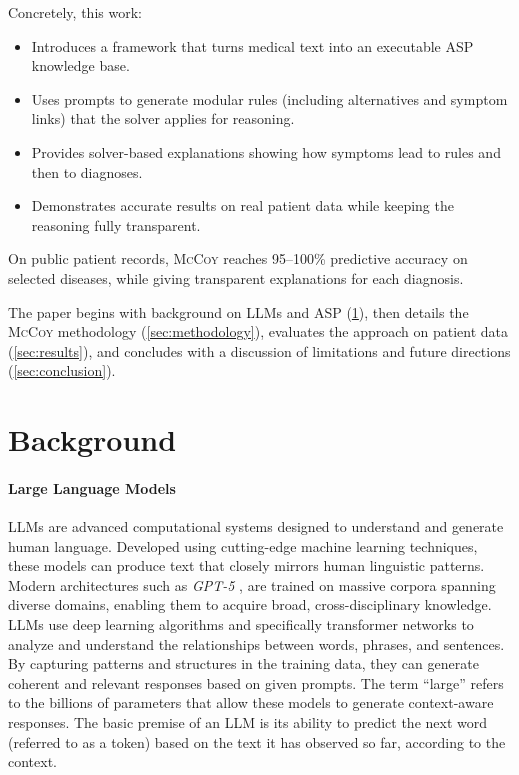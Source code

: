 \documentclass[11pt,leqno]{amsart}
\newcommand{\sys}{\textsc{McCoy}\xspace}
\begin{document}
Concretely, this work:
\begin{itemize}
    \item Introduces a framework that turns medical text into an executable ASP knowledge base.
    \item Uses prompts to generate modular rules (including alternatives and symptom links) that the solver applies for reasoning.
    \item Provides solver-based explanations showing how symptoms lead to rules and then to diagnoses.
    \item Demonstrates accurate results on real patient data while keeping the reasoning fully transparent.
\end{itemize}

On public patient records, \sys reaches 95–100\% predictive accuracy on selected diseases, 
while giving transparent explanations for each diagnosis.

The paper begins with background on LLMs and ASP (\cref{sec:background}), 
then details the \sys methodology (\cref{sec:methodology}), 
evaluates the approach on patient data (\cref{sec:results}), 
and concludes with a discussion of limitations and future directions (\cref{sec:conclusion}).

\section{Background}\label{sec:background}

\paragraph{\textbf{Large Language Models}}
LLMs \cite{zhao2023survey} are advanced computational systems 
designed to understand and generate human language. 
Developed using cutting-edge machine learning techniques, 
these models can produce text that closely mirrors human linguistic patterns.
Modern architectures such as \textit{GPT-5} \cite{openai2023gpt4, gpt5}, 
are trained on massive corpora spanning diverse domains, 
enabling them to acquire broad, cross-disciplinary knowledge. 
LLMs use deep learning algorithms \cite{Sarker2021} 
and specifically transformer networks \cite{Dosovitskiy2020} 
to analyze and understand the relationships between words, phrases, and sentences. 
By capturing patterns and structures in the training data, 
they can generate coherent and relevant responses based on given prompts.
The term “large” refers to the billions of parameters 
that allow these models to generate context-aware responses. 
The basic premise of an LLM is its ability to predict 
the next word (referred to as a token) based on the text it has observed so far, 
according to the context.
\end{document}
